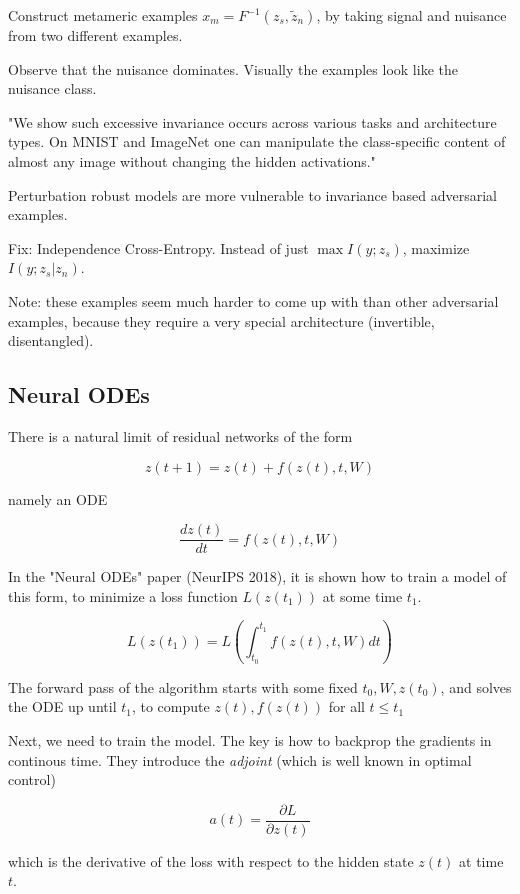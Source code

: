 \documentclass[english]{article}
\begin{document}
Construct metameric examples $x_m = F^{-1}(z_s,\tilde z_n)$, by taking signal and nuisance from two different examples. 

Observe that the nuisance dominates. Visually the examples look like the nuisance class.

"We show such excessive invariance occurs across various
tasks and architecture types. On MNIST and ImageNet one can manipulate the
class-specific content of almost any image without changing the hidden activations."

Perturbation robust models are more vulnerable to invariance based adversarial examples.

Fix: Independence Cross-Entropy. Instead of just $\max I(y;z_s)$, maximize $I(y;z_s|z_n)$.

Note: these examples seem much harder to come up with than other adversarial examples, because they require a very special architecture (invertible, disentangled). 

\eitem 


\subsection{Neural ODEs}
%
\bitem
\item There is a natural limit of residual networks of the form 

$$z(t+1) = z(t) + f(z(t),t,W)$$

namely an ODE

$$\frac{dz(t)}{dt} = f(z(t),t,W)$$

\item In the "Neural ODEs" paper (NeurIPS 2018), it is shown how to train a model of this form, to minimize a loss function $L(z(t_1))$ at some time $t_1$.

$$L(z(t_1)) = L(\int_{t_0}^{t_1} f(z(t),t,W)dt)$$

\item The forward pass of the algorithm starts with some fixed $t_0,W,z(t_0)$, and solves the ODE up until $t_1$, to compute $z(t), f(z(t))$ for all $t\le t_1$

\item Next, we need to train the model. The key is how to backprop the gradients in continous time. They introduce the \emph{adjoint} (which is well known in optimal control)

$$a(t) = \frac{\partial L}{\partial z(t)}$$

which is the derivative of the loss with respect to the hidden state $z(t)$ at time $t$.
\end{document}
